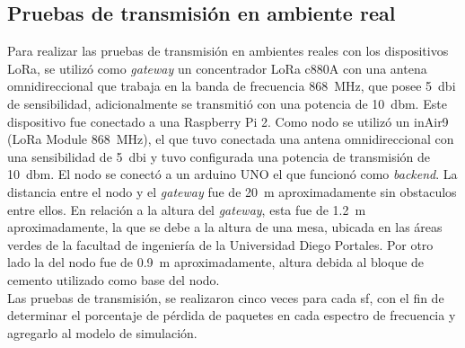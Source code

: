 \begin{justify}
\subsection{Pruebas de transmisión en ambiente real}
Para realizar las pruebas de transmisión en ambientes reales con los dispositivos LoRa, se utilizó como \textit{gateway} un concentrador LoRa c880A con una antena omnidireccional que trabaja en la banda de frecuencia \SI{868}{\mega\hertz}, que posee \SI{5}{dbi} de sensibilidad, adicionalmente se transmitió con una potencia de \SI{10}{dbm}. Este dispositivo fue conectado a una Raspberry Pi 2. Como nodo se utilizó un inAir9 (LoRa Module \SI{868}{\mega\hertz}), el que tuvo conectada una antena omnidireccional con una sensibilidad de \SI{5}{dbi} y tuvo configurada una potencia de transmisión de \SI{10}{dbm}. El nodo se conectó a un arduino UNO el que funcionó como \textit{backend}. La distancia entre el nodo y el \textit{gateway} fue de \SI{20}{\meter} aproximadamente sin obstaculos entre ellos. En relación a la altura del \textit{gateway}, esta fue de \SI{1.2}{\meter} aproximadamente, la que se debe a la altura de una mesa, ubicada en las áreas verdes de la facultad de ingeniería de la Universidad Diego Portales. Por otro lado la del nodo fue de \SI{0.9}{\meter} aproximadamente, altura debida al bloque de cemento utilizado como base del nodo.\\
Las pruebas de transmisión, se realizaron cinco veces para cada \gls{sf}, con el fin de determinar el porcentaje de pérdida de paquetes en cada espectro de frecuencia y agregarlo al modelo de simulación. \noindent

\end{justify}
